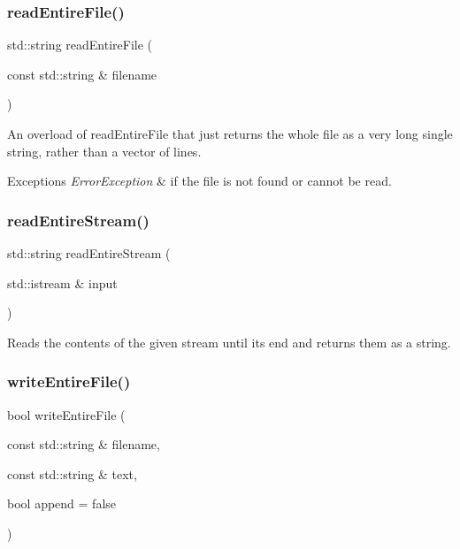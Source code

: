 \subsubsection{\texorpdfstring{read\+Entire\+File()}{readEntireFile()}\hspace{0.1cm}{\footnotesize\ttfamily [2/2]}}
{\footnotesize\ttfamily std\+::string read\+Entire\+File (\begin{DoxyParamCaption}\item[{const std\+::string \&}]{filename }\end{DoxyParamCaption})}



An overload of read\+Entire\+File that just returns the whole file as a very long single string, rather than a vector of lines. 


\begin{DoxyExceptions}{Exceptions}
{\em Error\+Exception} & if the file is not found or cannot be read. \\
\hline
\end{DoxyExceptions}
\mbox{\label{namespacesgl_1_1priv_1_1filelib_adb97dddab428509c4f231f8ecfaa095e}} 
\subsubsection{\texorpdfstring{read\+Entire\+Stream()}{readEntireStream()}}
{\footnotesize\ttfamily std\+::string read\+Entire\+Stream (\begin{DoxyParamCaption}\item[{std\+::istream \&}]{input }\end{DoxyParamCaption})}



Reads the contents of the given stream until its end and returns them as a string. 

\mbox{\label{namespacesgl_1_1priv_1_1filelib_a4cbf54fb7425b655a19f0aa36f6bfdc2}} 
\subsubsection{\texorpdfstring{write\+Entire\+File()}{writeEntireFile()}}
{\footnotesize\ttfamily bool write\+Entire\+File (\begin{DoxyParamCaption}\item[{const std\+::string \&}]{filename,  }\item[{const std\+::string \&}]{text,  }\item[{bool}]{append = {\ttfamily false} }\end{DoxyParamCaption})}



